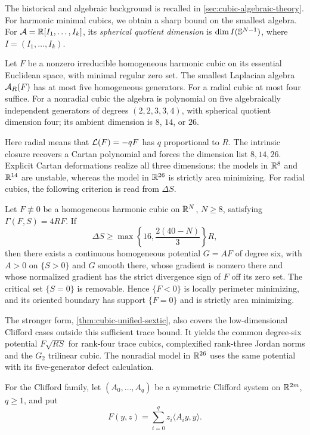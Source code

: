 The historical and algebraic background is recalled in
\cref{sec:cubic-algebraic-theory}. For harmonic minimal cubics, we
obtain a sharp bound on the smallest algebra.
For \(\mathcal A=\mathbb R[I_1,\ldots,I_k]\), its \emph{spherical quotient dimension}
is \(\dim I(\mathbb S^{N-1})\), where \(I=(I_1,\ldots,I_k)\).

\begin{maintheorem}
\label{main:cubic-generator-bound}
Let $F$ be a nonzero irreducible homogeneous harmonic cubic on its
essential Euclidean space, with minimal regular zero set. The smallest
Laplacian algebra $\mathcal A_R(F)$ has at most five homogeneous generators.
For a radial cubic at most four suffice. For a nonradial cubic the
algebra is polynomial on five algebraically independent generators of
degrees $(2,2,3,3,4)$, with spherical quotient dimension four;
its ambient dimension is $8$, $14$, or $26$.
\end{maintheorem}
Here radial means that $\mathcal L(F)=-qF$ has $q$ proportional to $R$.
The intrinsic closure recovers a Cartan polynomial and forces the
dimension list $8,14,26$. Explicit Cartan deformations realize all
three dimensions: the models in $\mathbb R^8$ and $\mathbb R^{14}$ are unstable,
whereas the model in $\mathbb R^{26}$ is strictly area minimizing.
For radial cubics, the following criterion is read from $\Delta S$.

\begin{maintheorem}
\label{main:cubic-trace}
Let $F\not\equiv0$ be a homogeneous harmonic cubic on $\mathbb R^N$,
$N\ge8$, satisfying $\Gamma(F,S)=4RF$. If
\[
 \Delta S\ge\max\left\{16,\frac{2(40-N)}3\right\}R,
\]
then there exists a continuous homogeneous potential $G=AF$ of
degree six, with $A>0$ on $\{S>0\}$ and $G$ smooth there, whose
gradient is nonzero there and whose normalized gradient has the
strict divergence sign of $F$ off its zero set. The critical set
$\{S=0\}$ is removable. Hence $\{F<0\}$ is locally perimeter
minimizing, and its oriented boundary has support $\{F=0\}$ and
is strictly area minimizing.
\end{maintheorem}
The stronger form, \cref{thm:cubic-unified-sextic}, also covers the
low-dimensional Clifford cases outside this sufficient trace bound.
It yields the common degree-six potential $F\sqrt{RS}$ for rank-four
trace cubics, complexified rank-three Jordan norms and the $G_2$
trilinear cubic. The nonradial model in $\mathbb R^{26}$ uses the same
potential with its five-generator defect calculation.

For the Clifford family, let $(A_0,\ldots,A_q)$ be a symmetric
Clifford system on $\mathbb R^{2m}$, $q\ge1$, and put
\[
 F(y,z)=\sum_{i=0}^qz_i\langle A_i y,y\rangle.
\]

